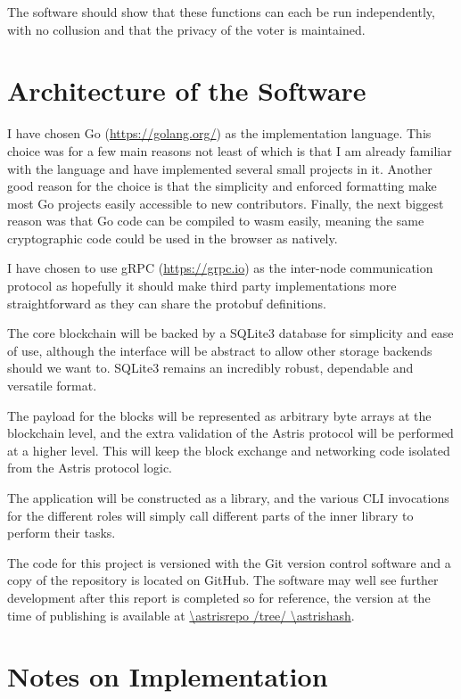 The software should show that these functions can each be run independently, with no collusion and that the privacy of the voter is maintained.

\section{Architecture of the Software}
\label{ch:sw:architecture}

I have chosen Go (\url{https://golang.org/}) as the implementation language. This choice was for a few main reasons not least of which is that I am already familiar with the language and have implemented several small projects in it. Another good reason for the choice is that the simplicity and enforced formatting make most Go projects easily accessible to new contributors. Finally, the next biggest reason was that Go code can be compiled to \gls{wasm} easily, meaning the same cryptographic code could be used in the browser as natively.

I have chosen to use gRPC (\url{https://grpc.io}) as the inter-node communication protocol as hopefully it should make third party implementations more straightforward as they can share the protobuf definitions.

The core blockchain will be backed by a SQLite3 database for simplicity and ease of use, although the interface will be abstract to allow other storage backends should we want to. SQLite3 remains an incredibly robust, dependable and versatile format.

The payload for the blocks will be represented as arbitrary byte arrays at the blockchain level, and the extra validation of the Astris protocol will be performed at a higher level. This will keep the block exchange and networking code isolated from the Astris protocol logic.

The application will be constructed as a library, and the various CLI invocations for the different roles will simply call different parts of the inner library to perform their tasks.

The code for this project is versioned with the Git version control software and a copy of the repository is located on GitHub. The software may well see further development after this report is completed so for reference, the version at the time of publishing is available at \url{\astrisrepo /tree/ \astrishash}.

\section{Notes on Implementation}
\label{ch:sw:notes}

